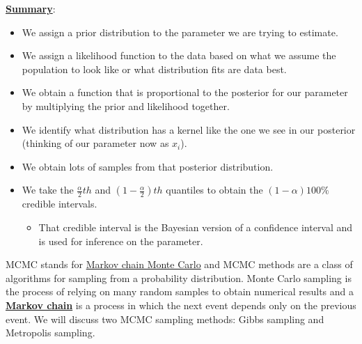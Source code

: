 \documentclass[11pt]{article}
\newcommand{\ub}[1]{{\bf \uline{#1}}}
\begin{document}
\vspace{-0.4in}

\ub{Summary}:
\begin{itemize}
\item We assign a prior distribution to the parameter we are trying to estimate.
\item We assign a likelihood function to the data based on what we assume the population to look like or what distribution fits are data best.
\item We obtain a function that is proportional to the posterior for our parameter by multiplying the prior and likelihood together.
\item We identify what distribution has a kernel like the one we see in our posterior (thinking of our parameter now as $x_i$).
\item We obtain lots of samples from that posterior distribution.
\item We take the $\frac{\alpha}{2}th$ and $(1-\frac{\alpha}{2})th$ quantiles to obtain the $(1-\alpha)100\%$ credible intervals.
\begin{itemize}
\item That credible interval is the Bayesian version of a confidence interval and is used for inference on the parameter.
\end{itemize}
\end{itemize}

\newpage



\centerline{}

MCMC stands for \uline{Markov chain Monte Carlo} and MCMC methods are a class of algorithms for sampling from a probability distribution. Monte Carlo sampling is the process of relying on many random samples to obtain numerical results and a \ub{Markov chain} is a process in which the next event depends only on the previous event. We will discuss two MCMC sampling methods: Gibbs sampling and Metropolis sampling. \\

\end{document}
